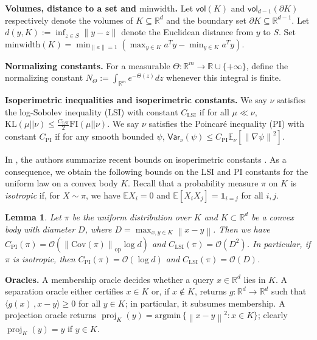 \documentclass[11pt,letterpaper]{article}
\newcommand{\R}{\mathbb{R}}
\newcommand{\norm}[1]{\left\lVert #1 \right\rVert}
\newcommand{\cov}[1]{\mathrm{Cov}{\left( #1\right)}}
\newcommand{\opnorm}[1]{\norm{#1}_{\operatorname{op}}}
\newcommand{\E}{\mathbb{E}}
\newcommand{\proj}{\operatorname{proj}}
\newcommand{\argmin}{\mathrm{argmin}\,}
\newcommand{\Var}{\mathsf{Var}}
\newcommand{\vol}{\mathsf{vol}}
\newcommand{\inner}[2]{\langle #1\,,#2 \rangle}
\newcommand{\brac}[1]{\left( #1\right)}
\newtheorem{lemma}[thm]{Lemma}
\begin{document}
\textbf{Volumes, distance to a set and $\mbox{minwidth}$.} Let $\vol(K)$ and $\vol_{d-1}(\partial K)$ respectively denote the volumes of $K\subseteq \R^d$ and the boundary set $\partial K \subseteq \R^{d-1}$. Let $d (y,K):=\inf_{z\in S}\|y-z\|$ denote the Euclidean distance from $y$ to $S$. Set $\mbox{minwidth}(K)=\min_{\norm{a}=1}\brac{\max_{y\in K}a^Ty-\min_{y\in K}a^Ty}$.



\textbf{Normalizing constants.} 
For a measurable $\Theta:\R^{m}\to\R\cup\{+\infty\}$, define the normalizing constant $N_\Theta:=\int_{\R^m} e^{-\Theta(z)}dz$ whenever this integral is finite.



\textbf{Isoperimetric inequalities and isoperimetric constants.} We say $\nu$ satisfies the log-Sobolev inequality (LSI) with constant $C_{\mathrm{LSI}}$ if for all $\mu\ll\nu$, $\mathrm{KL}(\mu||\nu)\le \frac{C_{\mathrm{LSI}}}{2} \mathrm{FI}(\mu||\nu)$. We say $\nu$ satisfies the Poincar\'e inequality (PI) with constant $C_{\mathrm{PI}}$ if for any smooth bounded $\psi$, $\Var_{\nu}(\psi)\le C_{\mathrm{PI}} \mathbb{E}_\nu\!\left[\norm{\nabla \psi}^2\right]$.

In \cite[Appendix~C]{kook2024inandout}, the authors summarize recent bounds on isoperimetric constants \cite{cheeger2015lower,kannan1995isoperimetric,lee2024eldan,chen2021almost,klartag2022bourgain,klartag2023logarithmic}. As a consequence, we obtain the following bounds on the LSI and PI constants for the uniform law on a convex body $K$. Recall that a probability measure $\pi$ on $K$ is \textit{isotropic} if, for $X\sim\pi$, we have $\E X_i=0$ and $\E[X_iX_j]=\mathbf{1}_{i=j}$ for all $i,j$.
  

    \begin{lemma}
    \label{lem:isoconstant}
    \cite[Lemma~18]{kook2024inandout}
    Let $\pi$ be the uniform distribution over $K$ and $K\subset \R^d$ be a convex body with diameter $D$, where $D=\max_{x,y\in K}\norm{x-y}$. Then we have   $C_{\mathrm{PI}}(\pi)=  \mathcal{O}\brac{\opnorm{\cov {\pi}}\log d}$ and $C_\mathrm{LSI}(\pi)=\mathcal{O} \brac{D^2}$. In particular, if $\pi$ is isotropic, then $C_{\mathrm{PI}}(\pi)=  \mathcal{O}\brac{\log d}$ and $C_\mathrm{LSI}(\pi)=\mathcal{O} \brac{D}$.
\end{lemma}





\textbf{Oracles.} A membership oracle decides whether a query $x\in\R^d$ lies in $K$. A separation oracle either certifies $x\in K$ or, if $x\notin K$, returns $g:\R^d\to\R^d$ such that $\inner{g(x)}{x-y}\ge 0$ for all $y\in K$; in particular, it subsumes membership. A projection oracle returns $\proj_K(y)=\argmin\{\norm{x-y}^2: x\in K\}$; clearly $\proj_K(y)=y$ if $y\in K$.
\end{document}
